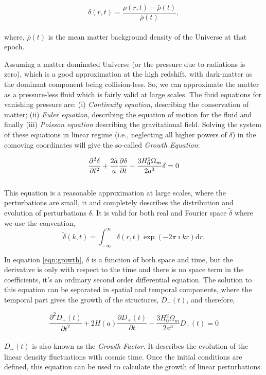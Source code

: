 \begin{equation}
	\delta(r,t) = \dfrac{\rho(r,t) - \bar{\rho}(t)}{\bar{\rho}(t)},
\end{equation}
\\
where, $\bar{\rho}(t)$ is the mean matter background density 
of the Universe at that epoch. 

Assuming a matter dominated Universe (or the pressure due to radiations
is zero), which is a good approximation at the
high redshift, with dark-matter as the dominant component being collision-less. 
So, we can approximate the matter as a pressure-less fluid which is fairly 
valid at large scales. The fluid equations for vanishing pressure are: 
(i) {\it Continuity equation}, describing the conservation of matter; (ii) {\it Euler
equation}, describing the equation of motion for the fluid and finally (iii) 
{\it Poisson equation} describing the gravitational field. Solving the system of these
equations in linear regime (i.e., neglecting all higher powers of $\delta$) in 
the comoving coordinates will give
the so-called {\it Growth Equation}:

\begin{equation}
\centering
\dfrac{\partial^2 {\delta}}{\partial t^2} + \dfrac{2\dot{a}}{a} 
		\dfrac{\partial {\delta}}{\partial t}
		- \dfrac{3H_0^2 \Omega_m}{2a^3} {\delta} = 0
		\label{eqn:growth}
\end{equation}
\\
This equation is a reasonable approximation at large scales, where the perturbations
are small, it and completely describes the distribution and evolution of perturbations $\delta$. 
It is valid for both real and Fourier space $\tilde{\delta}$ where we use the convention,
\begin{equation}
	\tilde{\delta}(k,t) = \int_{-\infty}^{\infty} \delta(r,t) \exp(-2\pi \imath kr) \mathrm{d}r.
\end{equation}

In equation \ref{eqn:growth}, $\delta$ is a function of both space
and time, but the derivative is only with respect to the time and there is 
no space term in the coefficients, it's an ordinary second order differential equation.
The solution to this equation can be 
separated in spatial and temporal components, where the temporal part gives the 
growth of the structures, $D_+(t)$, and therefore,

\begin{equation}
	\dfrac{\partial^2 D_+(t)}{\partial t^2} + 2 H(a)
		\dfrac{\partial D_+(t)}{\partial t}
		- \dfrac{3H_0^2 \Omega_m}{2a^3} D_+(t) = 0
		\label{eqn:growthfactor}
\end{equation}
\\
$D_+(t)$ is also known as the {\it Growth Factor}. It describes the evolution of the
linear density fluctuations with cosmic time. Once the initial conditions
are defined, this equation can be used to calculate the growth of linear perturbations. 

